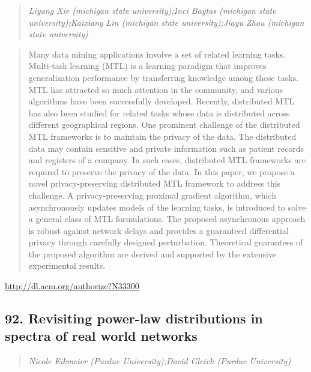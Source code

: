 \documentclass{article}
\begin{document}
\begin{quote}
\footnotesize{\textit{Liyang Xie (michigan state university);Inci Baytas (michigan state university);Kaixiang Lin (michigan state university);Jiayu Zhou (michigan state university)}}

\end{quote}

\begin{quote}
Many data mining applications involve a set of related learning tasks. Multi-task learning (MTL) is a learning paradigm that improves generalization performance by transferring knowledge among those tasks. MTL has attracted so much attention in the community, and various algorithms have been successfully developed. Recently, distributed MTL has also been studied for related tasks whose data is distributed across different geographical regions. One prominent challenge of the distributed MTL frameworks is to maintain the privacy of the data. The distributed data may contain sensitive and private information such as patient records and registers of a company. In such cases, distributed MTL frameworks are required to preserve the privacy of the data. In this paper, we propose a novel privacy-preserving distributed MTL framework to address this challenge. A privacy-preserving proximal gradient algorithm, which asynchronously updates models of the learning tasks, is introduced to solve a general class of MTL formulations. The proposed asynchronous approach is robust against network delays and provides a guaranteed differential privacy through carefully designed perturbation. Theoretical guarantees of the proposed algorithm are derived and supported by the extensive experimental results.
\end{quote}

\href{http://dl.acm.org/authorize?N33300}{http://dl.acm.org/authorize?N33300}

\subsection{92. Revisiting power-law distributions in spectra of real world networks}

\begin{quote}
\footnotesize{\textit{Nicole Eikmeier (Purdue University);David Gleich (Purdue University)}}

\end{quote}
\end{document}
